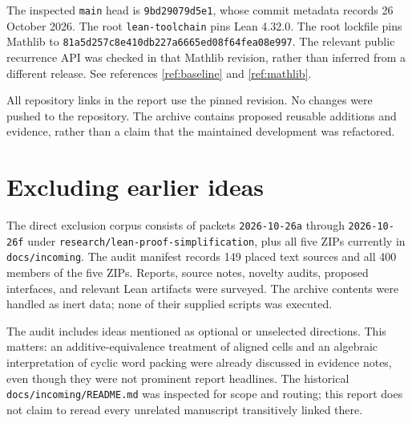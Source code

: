 \documentclass[11pt,a4paper]{article}
\newcommand{\code}[1]{\nolinkurl{#1}}
\begin{document}
The inspected \code{main} head is \code{9bd29079d5e1}, whose commit metadata
records 26 October 2026. The root \code{lean-toolchain} pins Lean 4.32.0.
The root lockfile pins Mathlib to
\code{81a5d257c8e410db227a6665ed08f64fea08e997}.
The relevant public recurrence API was checked in that Mathlib revision,
rather than inferred from a different release. See references
\ref{ref:baseline} and \ref{ref:mathlib}.

All repository links in the report use the pinned revision. No changes were
pushed to the repository. The archive contains proposed reusable additions and
evidence, rather than a claim that the maintained development was refactored.

\section{Excluding earlier ideas}

The direct exclusion corpus consists of packets \code{2026-10-26a} through
\code{2026-10-26f} under \code{research/lean-proof-simplification}, plus all
five ZIPs currently in \code{docs/incoming}. The audit manifest records 149
placed text sources and all 400 members of the five ZIPs. Reports, source notes,
novelty audits, proposed interfaces, and relevant Lean artifacts were surveyed.
The archive contents were handled as inert data; none of their supplied scripts
was executed.

The audit includes ideas mentioned as optional or unselected directions. This
matters: an additive-equivalence treatment of aligned cells and an algebraic
interpretation of cyclic word packing were already discussed in evidence notes,
even though they were not prominent report headlines. The historical
\code{docs/incoming/README.md} was inspected for scope and routing; this report
does not claim to reread every unrelated manuscript transitively linked there.
\end{document}
